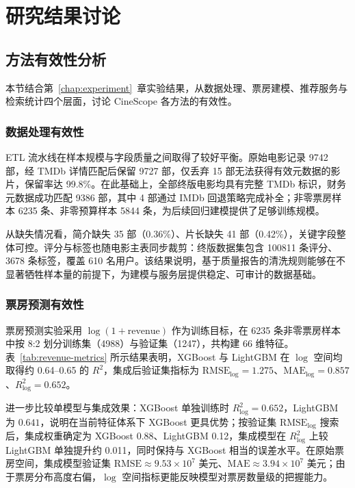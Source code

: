 \chapter{研究结果讨论}
\label{chap:discussion}

\section{方法有效性分析}
\label{sec:discussion:effectiveness}

本节结合第~\ref{chap:experiment}~章实验结果，从数据处理、票房建模、推荐服务与检索统计四个层面，讨论 CineScope 各方法的有效性。

\subsection{数据处理有效性}

ETL 流水线在样本规模与字段质量之间取得了较好平衡。原始电影记录 9742 部，经 TMDb 详情匹配后保留 9727 部，仅丢弃 15 部无法获得有效元数据的影片，保留率达 99.8\%。在此基础上，全部终版电影均具有完整 TMDb 标识，财务元数据成功匹配 9386 部，其中 4 部通过 IMDb 回退策略完成补全；非零票房样本 6235 条、非零预算样本 5844 条，为后续回归建模提供了足够训练规模。

从缺失情况看，简介缺失 35 部（0.36\%）、片长缺失 41 部（0.42\%），关键字段整体可控。评分与标签也随电影主表同步裁剪：终版数据集包含 100811 条评分、3678 条标签，覆盖 610 名用户。该结果说明，基于质量报告的清洗规则能够在不显著牺牲样本量的前提下，为建模与服务层提供稳定、可审计的数据基础。

\subsection{票房预测有效性}

票房预测实验采用 $\log(1+\text{revenue})$ 作为训练目标，在 6235 条非零票房样本中按 8:2 划分训练集（4988）与验证集（1247），共构建 66 维特征。表~\ref{tab:revenue-metrics} 所示结果表明，XGBoost 与 LightGBM 在 $\log$ 空间均取得约 0.64--0.65 的 $R^2$，集成后验证集指标为 $\text{RMSE}_{\log}=1.275$、$\text{MAE}_{\log}=0.857$、$R^2_{\log}=0.652$。

进一步比较单模型与集成效果：XGBoost 单独训练时 $R^2_{\log}=0.652$，LightGBM 为 $0.641$，说明在当前特征体系下 XGBoost 更具优势；按验证集 $\text{RMSE}_{\log}$ 搜索后，集成权重确定为 XGBoost 0.88、LightGBM 0.12，集成模型在 $R^2_{\log}$ 上较 LightGBM 单独提升约 0.011，同时保持与 XGBoost 相当的误差水平。在原始票房空间，集成模型验证集 $\text{RMSE} \approx 9.53 \times 10^7$ 美元、$\text{MAE} \approx 3.94 \times 10^7$ 美元；由于票房分布高度右偏，$\log$ 空间指标更能反映模型对票房数量级的把握能力。


